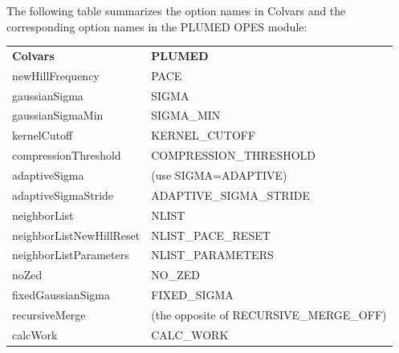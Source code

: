 The following table summarizes the option names in Colvars and the corresponding option names in the PLUMED OPES module:
\begin{table}[h]
\centering
\begin{tabular}{ll}
\textbf{Colvars} & \textbf{PLUMED} \\
newHillFrequency & PACE \\
gaussianSigma & SIGMA \\
gaussianSigmaMin & SIGMA\_MIN \\
kernelCutoff & KERNEL\_CUTOFF \\
compressionThreshold & COMPRESSION\_THRESHOLD \\
adaptiveSigma & (use SIGMA=ADAPTIVE) \\
adaptiveSigmaStride & ADAPTIVE\_SIGMA\_STRIDE \\
neighborList & NLIST \\
neighborListNewHillReset & NLIST\_PACE\_RESET \\
neighborListParameters & NLIST\_PARAMETERS \\
noZed & NO\_ZED \\
fixedGaussianSigma & FIXED\_SIGMA \\
recursiveMerge & (the opposite of RECURSIVE\_MERGE\_OFF) \\
calcWork & CALC\_WORK
\end{tabular}
\end{table}

